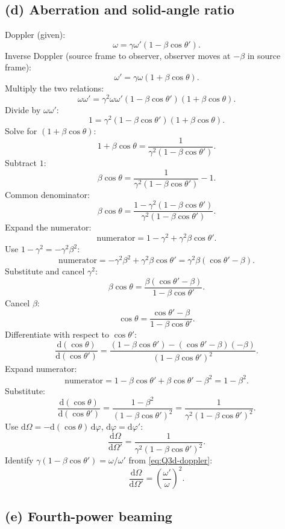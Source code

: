 \documentclass[11pt]{article}
\newcommand{\de}{\mathrm{d}}
\begin{document}
\subsection*{(d) Aberration and solid-angle ratio}

Doppler (given):
\begin{equation}
\omega=\gamma\omega'(1-\beta\cos\theta').
\label{eq:Q3d-doppler}
\end{equation}
Inverse Doppler (source frame to observer, observer moves at $-\beta$ in source frame):
\[ \omega'=\gamma\omega(1+\beta\cos\theta). \]
Multiply the two relations:
\[ \omega\omega'=\gamma^2\omega\omega'(1-\beta\cos\theta')(1+\beta\cos\theta). \]
Divide by $\omega\omega'$:
\[ 1=\gamma^2(1-\beta\cos\theta')(1+\beta\cos\theta). \]
Solve for $(1+\beta\cos\theta)$:
\[ 1+\beta\cos\theta=\frac{1}{\gamma^2(1-\beta\cos\theta')}. \]
Subtract $1$:
\[ \beta\cos\theta=\frac{1}{\gamma^2(1-\beta\cos\theta')}-1. \]
Common denominator:
\[ \beta\cos\theta=\frac{1-\gamma^2(1-\beta\cos\theta')}{\gamma^2(1-\beta\cos\theta')}. \]
Expand the numerator:
\[ \text{numerator}=1-\gamma^2+\gamma^2\beta\cos\theta'. \]
Use $1-\gamma^2=-\gamma^2\beta^2$:
\[ \text{numerator}=-\gamma^2\beta^2+\gamma^2\beta\cos\theta'=\gamma^2\beta(\cos\theta'-\beta). \]
Substitute and cancel $\gamma^2$:
\[ \beta\cos\theta=\frac{\beta(\cos\theta'-\beta)}{1-\beta\cos\theta'}. \]
Cancel $\beta$:
\begin{equation}
\boxed{\,\cos\theta=\frac{\cos\theta'-\beta}{1-\beta\cos\theta'}.\,}
\end{equation}
Differentiate with respect to $\cos\theta'$:
\[ \frac{\de(\cos\theta)}{\de(\cos\theta')}=\frac{(1-\beta\cos\theta')-(\cos\theta'-\beta)(-\beta)}{(1-\beta\cos\theta')^2}. \]
Expand numerator:
\[ \text{numerator}=1-\beta\cos\theta'+\beta\cos\theta'-\beta^2=1-\beta^2. \]
Substitute:
\[ \frac{\de(\cos\theta)}{\de(\cos\theta')}=\frac{1-\beta^2}{(1-\beta\cos\theta')^2}=\frac{1}{\gamma^2(1-\beta\cos\theta')^2}. \]
Use $\de\Omega=-\de(\cos\theta)\,\de\varphi$, $\de\varphi=\de\varphi'$:
\[ \frac{\de\Omega}{\de\Omega'}=\frac{1}{\gamma^2(1-\beta\cos\theta')^2}. \]
Identify $\gamma(1-\beta\cos\theta')=\omega/\omega'$ from \eqref{eq:Q3d-doppler}:
\begin{equation}
\boxed{\,\frac{\de\Omega}{\de\Omega'}=\left(\frac{\omega'}{\omega}\right)^{\!2}.\,}
\end{equation}

\subsection*{(e) Fourth-power beaming}
\end{document}
